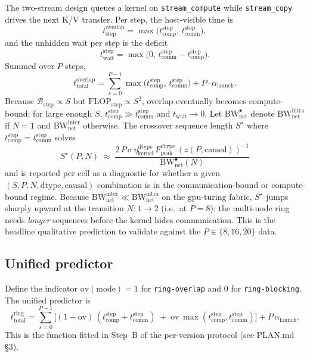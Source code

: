 \documentclass[11pt]{article}
\newcommand{\flops}{\mathrm{FLOP}}
\newcommand{\bw}{\mathrm{BW}}
\newcommand{\peak}{\mathrm{peak}}
\newcommand{\comp}{\mathrm{comp}}
\newcommand{\comm}{\mathrm{comm}}
\newcommand{\wait}{\mathrm{wait}}
\newcommand{\tot}{\mathrm{total}}
\newcommand{\step}{\mathrm{step}}
\newcommand{\dtype}{\mathrm{dtype}}
\newcommand{\Bd}{\sigma}        %
\begin{document}
The two-stream design queues a kernel on \texttt{stream\_compute}
while \texttt{stream\_copy} drives the next K/V transfer. Per step,
the host-visible time is
\begin{equation}
  t_\step^{\text{overlap}}
  = \max\!\bigl(t_\comp^\step,\, t_\comm^\step\bigr) ,
  \label{eq:step_overlap}
\end{equation}
and the unhidden wait per step is the deficit
\begin{equation}
  t_\wait^\step
  = \max\!\bigl(0,\, t_\comm^\step - t_\comp^\step\bigr) .
  \label{eq:wait_overlap}
\end{equation}
Summed over $P$ steps,
\begin{equation}
  \boxed{\;
  t_\tot^{\text{overlap}}
  = \sum_{s=0}^{P-1} \max\!\bigl(t_\comp^\step,\, t_\comm^\step\bigr)
  + P \cdot \alpha_{\text{launch}} .
  \;}
  \label{eq:tot_overlap}
\end{equation}
Because $\mathcal{B}_\step \propto S$ but $\flops_\step \propto S^2$,
overlap eventually becomes compute-bound: for large enough $S$,
$t_\comp^\step \gg t_\comm^\step$ and $t_\wait \to 0$. Let
$\bw_{\text{net}}^{\bullet}$ denote
$\bw_{\text{net}}^{\text{intra}}$ if $N = 1$ and
$\bw_{\text{net}}^{\text{inter}}$ otherwise. The crossover
sequence length $S^\star$ where $t_\comp^\step = t_\comm^\step$ solves
\begin{equation}
  S^\star(P, N) \;\approx\;
  \frac{2\,P\,\Bd\,\eta_{\text{kernel}}^\dtype\,F_\peak^\dtype
        \,(z(P,\text{causal}))^{-1}}
       {\bw_{\text{net}}^{\bullet}(N)}
  \label{eq:crossover}
\end{equation}
and is reported per cell as a diagnostic for whether a given
$(S, P, N, \dtype, \text{causal})$ combination is in the
communication-bound or compute-bound regime. Because
$\bw_{\text{net}}^{\text{inter}} \ll \bw_{\text{net}}^{\text{intra}}$
on the gpu-turing fabric, $S^\star$ jumps sharply upward at the
transition $N: 1 \to 2$ (i.e.~at $P = 8$): the multi-node ring needs
\emph{longer} sequences before the kernel hides communication. This
is the headline qualitative prediction to validate against the
$P \in \{8, 16, 20\}$ data.

\subsection{Unified predictor}

Define the indicator $\mathrm{ov}(\text{mode}) = 1$ for
\texttt{ring-overlap} and $0$ for \texttt{ring-blocking}. The unified
predictor is
\begin{equation}
  t_\tot^{\text{ring}}
  = \sum_{s=0}^{P-1}\!\Big[
      (1 - \mathrm{ov})\,(t_\comp^\step + t_\comm^\step) \;+\;
      \mathrm{ov}\,\max(t_\comp^\step, t_\comm^\step)
    \Big]
    + P\,\alpha_{\text{launch}} .
  \label{eq:tot_unified}
\end{equation}
This is the function fitted in Step~B of the per-version protocol
(see PLAN.md \S 3).
\end{document}
